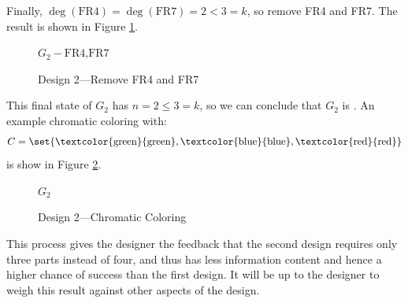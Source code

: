 Finally, \(\deg(\text{FR4})=\deg(\text{FR7})=2<3=k\), so remove FR4 and FR7.  The result is shown in Figure
\ref{fig:d2rem47}.

\begin{figure}[h]
  \label{fig:d2rem47}
  \begin{center}

    \bigskip

    \(G_2-\text{FR4,FR7}\)
  \end{center}
  \caption{Design 2---Remove FR4 and FR7}
\end{figure}

This final state of \(G_2\) has \(n=2\le3=k\), so we can conclude that \(G_2\) is .  An example
chromatic coloring with:
\[C=\set{\text{\textcolor{green}{green}},\text{\textcolor{blue}{blue}},\text{\textcolor{red}{red}}}\]
is show in Figure \ref{fig:d2color}.
\begin{figure}[h]
  \label{fig:d2color}
  \begin{center}

    \bigskip

    \(G_2\)
  \end{center}
  \caption{Design 2---Chromatic Coloring}
\end{figure}

This process gives the designer the feedback that the second design requires only three parts instead of four, and
thus has less information content and hence a higher chance of success than the first design.  It will be up to the
designer to weigh this result against other aspects of the design.
